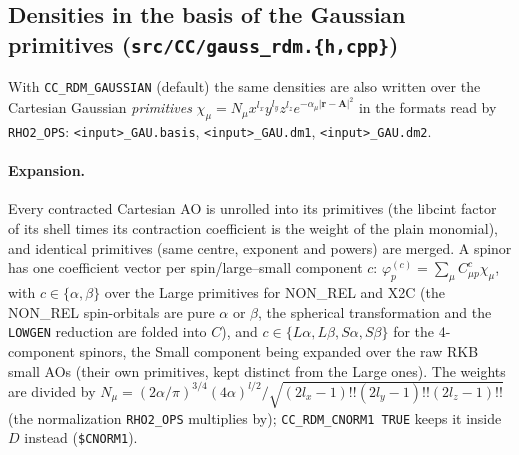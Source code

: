 \documentclass[11pt]{article}
\begin{document}
\subsection{Densities in the basis of the Gaussian primitives (\texttt{src/CC/gauss\_rdm.\{h,cpp\}})}

With \texttt{CC\_RDM\_GAUSSIAN} (default) the same densities are also written over the Cartesian Gaussian \emph{primitives}
$\chi_\mu=N_\mu x^{l_x}y^{l_y}z^{l_z}e^{-\alpha_\mu|\mathbf r-\mathbf A|^2}$ in the formats read by \texttt{RHO2\_OPS}:
\texttt{<input>\_GAU.basis}, \texttt{<input>\_GAU.dm1}, \texttt{<input>\_GAU.dm2}.

\paragraph{Expansion.} Every contracted Cartesian AO is unrolled into its primitives (the libcint factor of its shell times its
contraction coefficient is the weight of the plain monomial), and identical primitives (same centre, exponent and powers) are
merged. A spinor has one coefficient vector per spin/large--small component $c$: $\varphi_p^{(c)}=\sum_\mu C^{c}_{\mu p}\chi_\mu$,
with $c\in\{\alpha,\beta\}$ over the Large primitives for NON\_REL and X2C (the NON\_REL spin-orbitals are pure $\alpha$ or $\beta$,
the spherical transformation and the \texttt{LOWGEN} reduction are folded into $C$), and $c\in\{L\alpha,L\beta,S\alpha,S\beta\}$ for
the 4-component spinors, the Small component being expanded over the raw RKB small AOs (their own primitives, kept distinct from the
Large ones). The weights are divided by $N_\mu=(2\alpha/\pi)^{3/4}(4\alpha)^{l/2}/\sqrt{(2l_x-1)!!(2l_y-1)!!(2l_z-1)!!}$ (the
normalization \texttt{RHO2\_OPS} multiplies by); \texttt{CC\_RDM\_CNORM1 TRUE} keeps it inside $D$ instead (\texttt{\$CNORM1}).
\end{document}
